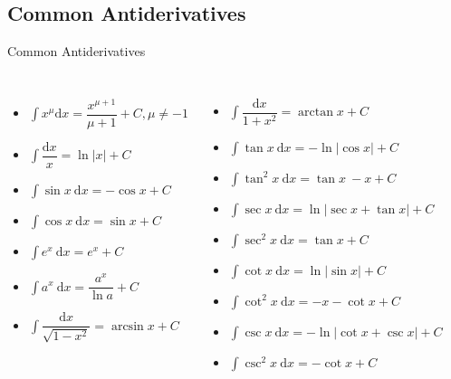 \documentclass[aspectratio=169, UTF8]{ctexbeamer}
\begin{document}
    \subsection{Common Antiderivatives}
    \begin{frame}[t]{Common Antiderivatives}
        \begin{columns}[c]
            \begin{itemize}
                \item $\int x^{\mu} \mathrm{d}x=\dfrac{x^{\mu+1}}{\mu+1}+C, \mu \neq-1$
                \item $\int \dfrac{\mathrm{d}x}{x}=\ln |x|+C$
                \item $\int \sin x\ \mathrm{d}x=-\cos x+C$
                \item $\int \cos x\ \mathrm{d}x=\sin x+C$
                \item $\int e^{x}\ \mathrm{d}x=e^{x}+C$
                \item $\int a^{x}\ \mathrm{d}x=\dfrac{a^x}{\ln a}+C$
                \item $\int \dfrac{\mathrm{d}x}{\sqrt{1-x^{2}}}=\arcsin x+C$
            \end{itemize}
        
            \begin{itemize}
                \item $\int \dfrac{\mathrm{d}x}{1+x^{2}}=\arctan x+C$
                \item $\int \tan x\ \mathrm{d}x=-\ln\left| \cos x \right|+C$
                \item $\int \tan^2 x\ \mathrm{d}x=\tan x\ -x+C$
                \item $\int \sec x\ \mathrm{d}x=\ln\left|\sec x +\tan x\right|+C$
                \item $\int \sec^2 x\ \mathrm{d}x=\tan x+C$
                \item $\int \cot x\ \mathrm{d}x=\ln\left| \sin x\right| +C$ 
                \item $\int \cot^2 x\ \mathrm{d}x=-x-\cot x +C$  
                \item $\int \csc x \ \mathrm{d}x=-\ln\left|\cot x+ \csc x\right|+C$
                \item $\int \csc^2 x\ \mathrm{d}x=-\cot x+C$
            \end{itemize}
        \end{columns}
    \end{frame}
\end{document}
